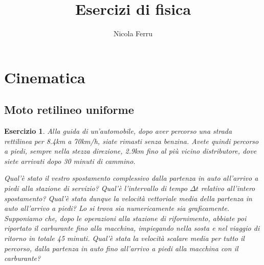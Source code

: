 \documentclass{article}
\title{Esercizi di fisica}
\author{Nicola Ferru}
\newtheorem{es}{Esercizio}[section]
\begin{document}
\maketitle

\section{Cinematica}
\label{sec:cinematica}

\subsection{Moto retilineo uniforme}
\label{sec:motoretuni}

\begin{es}
  Alla guida di un'automobile, dopo aver percorso una strada rettilinea per 8.4km a 70km/h, siate rimasti senza benzina. Avete quindi percorso a piedi, sempre nella stezza direzione, 2.9km fino al più vicino distributore, dove siete arrivati dopo 30 minuti di cammino.
  \begin{tasks}
    \task Qual'è stato il vestro spostamento complessivo dalla partenza in auto all'arrivo a piedi alla stazione di servizio?
    \task Qual'è l'intervallo di tempo $\Delta{}t$ relativo all'intero spostamento?
    \task Qual'è stata dunque la velocità vettoriale media della partenza in auto all'arrivo a piedi? Lo si trova sia numericamente sia graficamente.
    \task Supponiamo che, dopo le operazioni alla stazione di rifornimento, abbiate poi riportato il carburante fino alla macchina, impiegando nella sosta e nel viaggio di ritorno in totale 45 minuti. Qual'è stata la velocità scalare media per tutto il percorso, dalla partenza in auto fino all'arrivo a piedi alla macchina con il carburante?
  \end{tasks}
\end{es}
\end{document}
